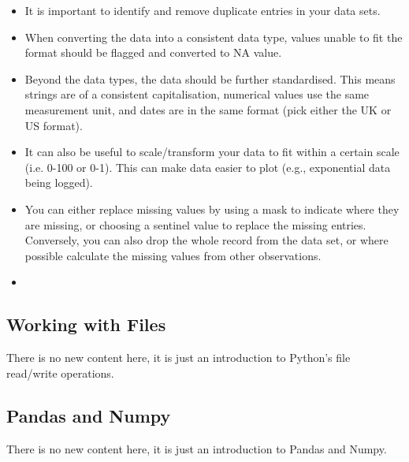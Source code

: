 \begin{itemize}
    \item It is important to identify and remove duplicate entries in your data sets.
    \item When converting the data into a consistent data type, values unable to fit the format should be flagged and converted to NA value.
    \item Beyond the data types, the data should be further standardised. This means strings are of a consistent capitalisation, numerical values use the same measurement unit, and dates are in the same format (pick either the UK or US format).
    \item It can also be useful to scale/transform your data to fit within a certain scale (i.e. 0-100 or 0-1). This can make data easier to plot (e.g., exponential data being logged).
    \item You can either replace missing values by using a mask to indicate where they are missing, or choosing a sentinel value to replace the missing entries. Conversely, you can also drop the whole record from the data set, or where possible calculate the missing values from other observations.
    \item {}
\end{itemize}



\subsection{Working with Files}

There is no new content here, it is just an introduction to Python's file read/write operations.

\subsection{Pandas and Numpy}

There is no new content here, it is just an introduction to Pandas and Numpy.


